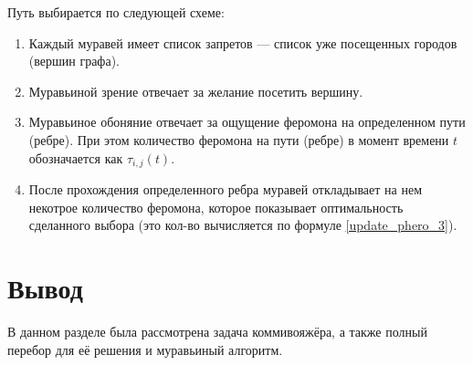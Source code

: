 Путь выбирается по следующей схеме:

\begin{enumerate}
	\item Каждый муравей имеет список запретов --- список уже посещенных городов (вершин графа).
	\item Муравьиной зрение отвечает за желание посетить вершину.
	\item Муравьиное обоняние отвечает за ощущение феромона на определенном пути (ребре). При этом количество феромона на пути (ребре) в момент времени $t$ обозначается как $\tau_{i, j} (t)$.
	\item После прохождения определенного ребра муравей откладывает на нем некотрое количество феромона, которое показывает оптимальность сделанного выбора (это кол-во вычисляется по формуле \eqref{update_phero_3}).
\end{enumerate}



\section*{Вывод}

В данном разделе была рассмотрена задача коммивояжёра, а также полный перебор для её решения и муравьиный алгоритм.
